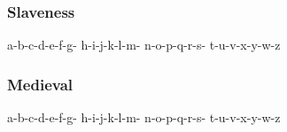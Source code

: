 \section{Slaveness}
a-b-c-d-e-f-g-
h-i-j-k-l-m-
n-o-p-q-r-s-
t-u-v-x-y-w-z

\section{Medieval}
a-b-c-d-e-f-g-
h-i-j-k-l-m-
n-o-p-q-r-s-
t-u-v-x-y-w-z
%
%




\part{\titulo}


